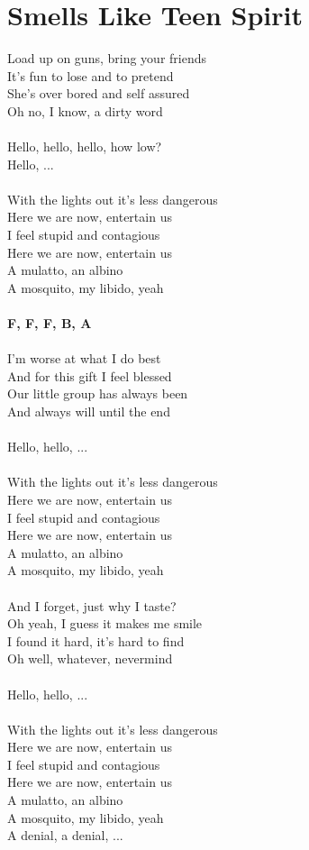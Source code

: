 \section{Smells Like Teen Spirit}
Load up on guns, bring your friends\\
It's fun to lose and to pretend\\
She's over bored and self assured\\
Oh no, I know, a dirty word\\
\\
Hello, hello, hello, how low?\\
Hello, ...\\
\\
With the lights out it's less dangerous\\
Here we are now, entertain us\\
I feel stupid and contagious\\
Here we are now, entertain us\\
A mulatto, an albino\\
A mosquito, my libido, yeah\\
\\
\footnotesize\textbf{F, F\kr, F, B\be, A\be}\\
\normalsize
\\
I'm worse at what I do best\\
And for this gift I feel blessed\\
Our little group has always been\\
And always will until the end\\
\\
Hello, hello, ...\\
\\
With the lights out it's less dangerous\\
Here we are now, entertain us\\
I feel stupid and contagious\\
Here we are now, entertain us\\
A mulatto, an albino\\
A mosquito, my libido, yeah\\
\\
And I forget, just why I taste?\\
Oh yeah, I guess it makes me smile\\
I found it hard, it's hard to find\\
Oh well, whatever, nevermind\\
\\
Hello, hello, ...\\
\\
With the lights out it's less dangerous\\
Here we are now, entertain us\\
I feel stupid and contagious\\
Here we are now, entertain us\\
A mulatto, an albino\\
A mosquito, my libido, yeah\\
A denial, a denial, ...
